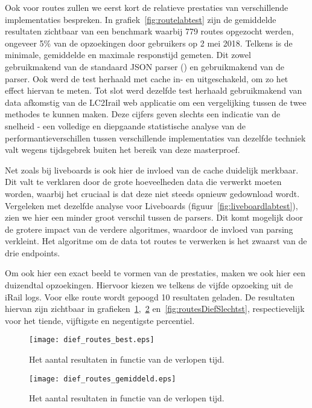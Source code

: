 Ook voor routes zullen we eerst kort de relatieve prestaties van verschillende implementaties bespreken. In grafiek~\ref{fig:routelabtest} zijn de gemiddelde resultaten zichtbaar van een benchmark waarbij 779 routes opgezocht werden, ongeveer 5\% van de opzoekingen door gebruikers op 2 mei 2018. Telkens is de minimale, gemiddelde en maximale responstijd gemeten. Dit zowel gebruikmakend van de standaard JSON parser () en gebruikmakend van de  parser. Ook werd de test herhaald met cache in- en uitgeschakeld, om zo het effect hiervan te meten. Tot slot werd dezelfde test herhaald gebruikmakend van data afkomstig van de LC2Irail web applicatie om een vergelijking tussen de twee methodes te kunnen maken. Deze cijfers geven slechts een indicatie van de snelheid - een volledige en diepgaande statistische analyse van de performantieverschillen tussen verschillende implementaties van dezelfde techniek valt wegens tijdsgebrek buiten het bereik van deze masterproef.

Net zoals bij liveboards is ook hier de invloed van de cache duidelijk merkbaar. Dit valt te verklaren door de grote hoeveelheden data die verwerkt moeten worden, waarbij het cruciaal is dat deze niet steeds opnieuw gedownload wordt. Vergeleken met dezelfde analyse voor Liveboards (figuur~\ref{fig:liveboardlabtest}), zien we hier een minder groot verschil tussen de parsers. Dit komt mogelijk door de grotere impact van de verdere algoritmes, waardoor de invloed van parsing verkleint. Het algoritme om de data tot routes te verwerken is het zwaarst van de drie endpoints. %

Om ook hier een exact beeld te vormen van de prestaties, maken we ook hier een duizendtal opzoekingen. Hiervoor kiezen we telkens de vijfde opzoeking uit de iRail logs. Voor elke route wordt gepoogd 10 resultaten geladen. De resultaten hiervan zijn zichtbaar in grafieken~\ref{fig:routesDiefBest},~\ref{fig:routesDiefAvg} en~\ref{fig:routesDiefSlechtst}, respectievelijk voor het tiende, vijftigste en negentigste percentiel.

\begin{figure}[h]
	\centering
	\texttt{[image: dief\_routes\_best.eps]}
	\caption[Aantal resultaten routes in functie van de tijd]{Het aantal resultaten in functie van de verlopen tijd.}
	\label{fig:routesDiefBest}
\end{figure}

\begin{figure}[h]
	\centering
	\texttt{[image: dief\_routes\_gemiddeld.eps]}
	\caption[Aantal resultaten routes in functie van de tijd]{Het aantal resultaten in functie van de verlopen tijd.}
	\label{fig:routesDiefAvg}
\end{figure}

